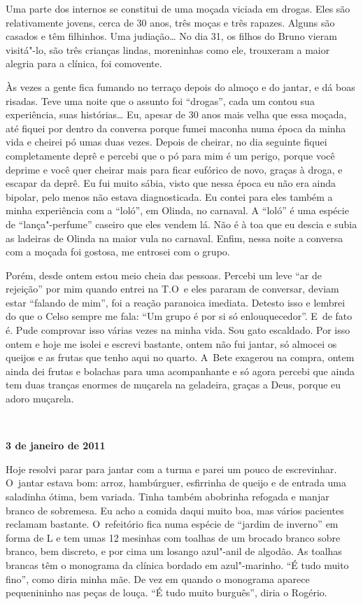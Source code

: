 Uma parte dos internos se constitui de uma moçada viciada em drogas.
Eles são relativamente jovens, cerca de 30 anos, três moças e três
rapazes. Alguns são casados e têm filhinhos. Uma judiação… No dia
31, os filhos do Bruno vieram visitá"-lo, são três crianças lindas,
moreninhas como ele, trouxeram a maior alegria para a clínica, foi
comovente.

Às vezes a gente fica fumando no terraço depois do almoço e do jantar, e
dá boas risadas. Teve uma noite que o assunto foi ``drogas'', cada um
contou sua experiência, suas histórias… Eu, apesar de 30 anos
mais velha que essa moçada, até fiquei por dentro da conversa porque
fumei maconha numa época da minha vida e cheirei pó umas duas vezes.
Depois de cheirar, no dia seguinte fiquei completamente deprê e percebi
que o pó para mim é um perigo, porque você deprime e você quer cheirar
mais para ficar eufórico de novo, graças à droga, e escapar da deprê. Eu
fui muito sábia, visto que nessa época eu não era ainda bipolar, pelo
menos não estava diagnosticada. Eu contei para eles também a minha
experiência com a ``loló'', em Olinda, no carnaval. A ``loló'' é uma
espécie de ``lança"-perfume'' caseiro que eles vendem lá. Não é à toa que
eu descia e subia as ladeiras de Olinda na maior vula no carnaval.
Enfim, nessa noite a conversa com a moçada foi gostosa, me entrosei com
o grupo.

Porém, desde ontem estou meio cheia das pessoas. Percebi um leve ``ar de
rejeição'' por mim quando entrei na T.O\, e eles pararam de conversar,
deviam estar ``falando de mim'', foi a reação paranoica imediata. Detesto
isso e lembrei do que o Celso sempre me fala: ``Um grupo é por si só
enlouquecedor''. E~de fato é. Pude comprovar isso várias vezes na minha
vida. Sou gato escaldado. Por isso ontem e hoje me isolei e escrevi
bastante, ontem não fui jantar, só almocei os queijos e as frutas que
tenho aqui no quarto. A~Bete exagerou na compra, ontem ainda dei frutas
e bolachas para uma acompanhante e só agora percebi que ainda tem duas
tranças enormes de muçarela na geladeira, graças a Deus, porque eu adoro
muçarela.

\begin{center}\asterisc{}​\end{center}

\begin{flushright}\textbf{3 de janeiro de 2011}\end{flushright}


Hoje resolvi parar para jantar com a turma e parei um pouco de
escrevinhar. O~jantar estava bom: arroz, hambúrguer, esfirrinha de
queijo e de entrada uma saladinha ótima, bem variada. Tinha também
abobrinha refogada e manjar branco de sobremesa. Eu acho a comida daqui
muito boa, mas vários pacientes reclamam bastante. O~refeitório fica
numa espécie de ``jardim de inverno'' em forma de L e tem umas 12
mesinhas com toalhas de um brocado branco sobre branco, bem discreto, e
por cima um losango azul"-anil de algodão. As toalhas brancas têm o
monograma da clínica bordado em azul"-marinho. ``É tudo muito fino'',
como diria minha mãe. De vez em quando o monograma aparece pequenininho
nas peças de louça. ``É tudo muito burguês'', diria o Rogério.


